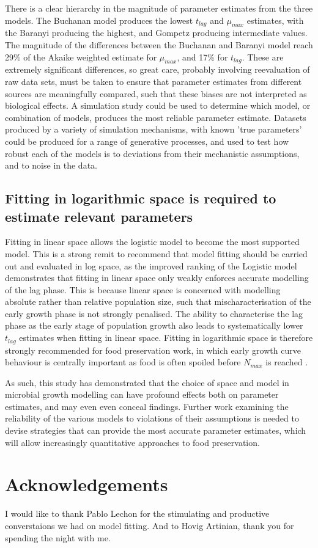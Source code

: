 \documentclass[11pt, a4paper]{article}
\begin{document}
\begin{linenumbers}
There is a clear hierarchy in the magnitude of parameter estimates from the three models. The Buchanan model produces the lowest $t_{lag}$ and $\mu_{max}$ estimates, with the Baranyi producing the highest, and Gompetz producing intermediate values. The magnitude of the differences between the Buchanan and Baranyi model reach 29\% of the Akaike weighted estimate for $\mu_{max}$, and 17\% for $t_{lag}$. These are extremely significant differences, so great care, probably involving reevaluation of raw data sets, must be taken to ensure that parameter estimates from different sources are meaningfully compared, such that these biases are not interpreted as biological effects. A simulation study could be used to determine which model, or combination of models, produces the most reliable parameter estimate. Datasets produced by a variety of simulation mechanisms, with known 'true parameters' could be produced for a range of generative processes, and used to test how robust each of the models is to deviations from their mechanistic assumptions, and to noise in the data.

\subsection{Fitting in logarithmic space is required to estimate relevant parameters}
Fitting in linear space allows the logistic model to become the most supported model. This is a strong remit to recommend that model fitting should be carried out and evaluated in log space, as the improved ranking of the Logistic model demonstrates that fitting in linear space only weakly enforces accurate modelling of the lag phase. This is because linear space is concerned with modelling absolute rather than relative population size, such that mischaracterisation of the early growth phase is not strongly penalised. The ability to characterise the lag phase as the early stage of population growth also leads to systematically lower $t_{lag}$ estimates when fitting in linear space. Fitting in logarithmic space is therefore strongly recommended for food preservation work, in which early growth curve behaviour is centrally important as food is often spoiled before $N_{max}$ is reached \cite{MicrobialGrowth}.

As such, this study has demonstrated that the choice of space and model in microbial growth modelling can have profound effects both on parameter estimates, and may even even conceal findings. Further work examining the reliability of the various models to violations of their assumptions is needed to devise strategies that can provide the most accurate parameter estimates, which will allow increasingly quantitative approaches to food preservation.



\section{Acknowledgements}
I would like to thank Pablo Lechon for the stimulating and productive converstaions we had on model fitting. And to Hovig Artinian, thank you for spending the night with me. 
\end{linenumbers}
\end{document}
